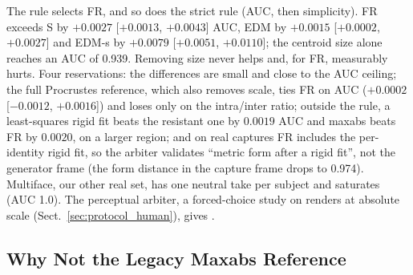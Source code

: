 The rule selects FR, and so does the strict rule (AUC, then simplicity).
FR exceeds S by $+0.0027$ [$+0.0013$, $+0.0043$] AUC, EDM by $+0.0015$
[$+0.0002$, $+0.0027$] and EDM-s by $+0.0079$ [$+0.0051$, $+0.0110$]; the
centroid size alone reaches an AUC of 0.939. Removing size never helps and,
for FR, measurably hurts.
Four reservations: the differences are small and close to the AUC ceiling;
the full Procrustes reference, which also removes scale, ties FR on AUC
($+0.0002$ [$-0.0012$, $+0.0016$]) and loses only on the intra/inter ratio;
outside the rule, a least-squares rigid fit beats the resistant one by
$0.0019$ AUC and maxabs beats FR by $0.0020$, on a larger region; and on
real captures FR includes the per-identity rigid fit, so the arbiter validates
``metric form after a rigid fit'', not the generator frame (the form distance
in the capture frame drops to 0.974).
Multiface, our other real set, has one neutral take per subject and
saturates (AUC 1.0).
The perceptual arbiter, a forced-choice study on renders at absolute scale
(Sect.~\ref{sec:protocol_human}), gives .

\subsection{Why Not the Legacy Maxabs Reference}
\label{sec:gt_maxabs}


